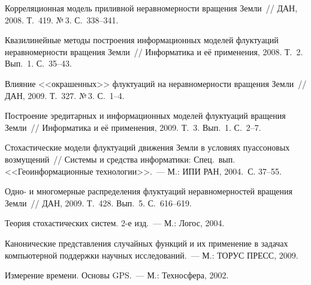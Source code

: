 \begin{multicols}{2}
{{\begin{thebibliography}{99}
Корреляционная модель приливной неравномерности вращения Земли~//
ДАН, 2008. Т.~419. №\,3. С.~338--341.

Квазилинейные методы построения информационных моделей флуктуаций неравномерности вращения Земли~//
Информатика и её применения, 2008. Т.~2. Вып.~1. С.~35--43.

Влияние <<окрашенных>> флуктуаций на неравномерности вращения Земли~//
ДАН, 2009. Т.~327. №\,3. С.~1--4.


Построение эредитарных и информационных моделей флуктуаций вращения Земли~// Информатика и её применения, 2009. 
Т.~3. Вып.~1. С.~2--7.

Стохастические модели флуктуаций движения Земли в условиях пуассоновых возмущений~//
Системы и средства информатики: Спец.\ вып. <<Геоинформационные технологии>>.~--- М.: ИПИ РАН, 2004.~С. 37--55.

Одно- и многомерные распределения флуктуаций неравномерностей вращения Земли~// ДАН, 2009.
Т.~428. Вып.~5. С.~616--619.

Теория стохастических систем. 2-е изд.~--- М.:  Логос, 2004.

Канонические представления случайных функций и их применение в задачах компьютерной поддержки 
научных исследований.~--- М.: ТОРУС ПРЕСС, 2009.

\label{end\stat}

Измерение времени. Основы GPS.~--- М.:  Техносфера, 2002.
 \end{thebibliography}
}
}
\end{multicols}